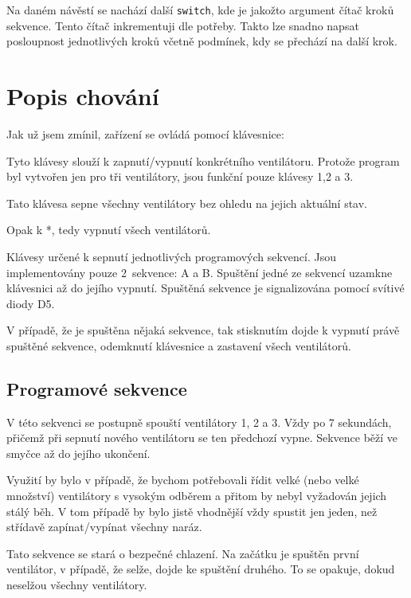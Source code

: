 \documentclass[11pt,a4paper,onecolumn,notitlepage]{article}
\begin{document}
	Na daném návěstí se nachází další \texttt{switch}, kde je jakožto argument čítač kroků sekvence. Tento čítač inkrementuji dle potřeby. Takto lze snadno napsat posloupnost jednotlivých kroků včetně podmínek, kdy se přechází na další krok. 
	
	
\newpage
\section{Popis chování}
Jak už jsem zmínil, zařízení se ovládá pomocí klávesnice:
\begin{description}[leftmargin=3em,style=nextline]
	\item[1 -- 9] Tyto klávesy slouží k zapnutí/vypnutí konkrétního ventilátoru. Protože program byl vytvořen jen pro tři ventilátory, jsou funkční pouze klávesy 1,2 a 3.
	\item[*] Tato klávesa sepne všechny ventilátory bez ohledu na jejich aktuální stav.
	\item[\#] Opak k *, tedy vypnutí všech ventilátorů.
	\item[A-D] Klávesy určené k sepnutí jednotlivých programových sekvencí. Jsou implementovány pouze 2~sekvence: A a B. Spuštění jedné ze sekvencí uzamkne klávesnici až do jejího vypnutí. Spuštěná sekvence je signalizována pomocí svítivé diody D5.
	\item[0] V případě, že je spuštěna nějaká sekvence, tak stisknutím dojde k vypnutí právě spuštěné sekvence, odemknutí klávesnice a zastavení všech ventilátorů.
\end{description}

	\subsection{Programové sekvence}
	\begin{description}[leftmargin=1.5em,style=nextline]
		\item[A] V této sekvenci se postupně spouští ventilátory 1, 2 a 3. Vždy po 7 sekundách, přičemž při sepnutí nového ventilátoru se ten předchozí vypne. Sekvence běží ve smyčce až do jejího ukončení.
		
		Využití by bylo v případě, že bychom potřebovali řídit velké (nebo velké množství) ventilátory s vysokým odběrem a přitom by nebyl vyžadován jejich stálý běh. V tom případě by bylo jistě vhodnější vždy spustit jen jeden, než střídavě zapínat/vypínat všechny naráz.
		
		\item[B] Tato sekvence se stará o bezpečné chlazení. Na začátku je spuštěn první ventilátor, v případě, že selže, dojde ke spuštění druhého. To se opakuje, dokud neselžou všechny ventilátory.
	\end{description}
\end{document}
